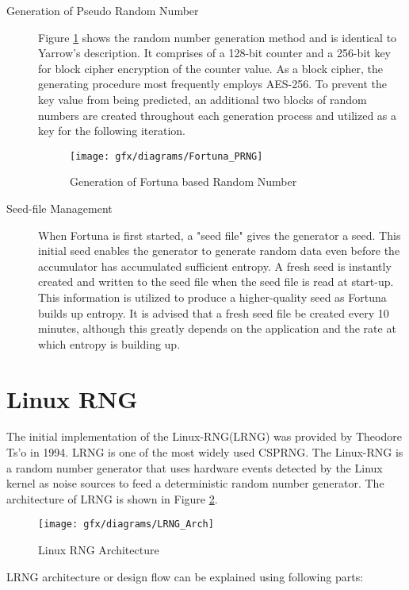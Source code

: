 \begin{description}
	\item[Generation of Pseudo Random Number] Figure \ref{fig:3:14} shows the random number generation method and is identical to Yarrow's description. It comprises of a 128-bit counter and a 256-bit key for block cipher encryption of the counter value. As a block cipher, the generating procedure most frequently employs AES-256. To prevent the key value from being predicted, an additional two blocks of random numbers are created throughout each generation process and utilized as a key for the following iteration.
	\begin{figure}[htbp]
		\centering
		\texttt{[image: gfx/diagrams/Fortuna\_PRNG]}
		\caption{Generation of Fortuna based Random Number}
		\label{fig:3:14}
	\end{figure}

	\item[Seed-file Management] When Fortuna is first started, a "seed file" gives the generator a seed. This initial seed enables the generator to generate random data even before the accumulator has accumulated sufficient entropy. A fresh seed is instantly created and written to the seed file when the seed file is read at start-up. This information is utilized to produce a higher-quality seed as Fortuna builds up entropy. It is advised that a fresh seed file be created every 10 minutes, although this greatly depends on the application and the rate at which entropy is building up.
\end{description}

%
%
\section{Linux RNG}
\label{sec:SoA:LRNG}
The initial implementation of the Linux-RNG(LRNG) was provided by Theodore Ts'o in 1994. LRNG is one of the most widely used CSPRNG. The Linux-RNG is a random number generator that uses hardware events detected by the Linux kernel as noise sources to feed a deterministic random number generator. The architecture of LRNG is shown in Figure \ref{fig:3:15}. 
\begin{figure}[htbp]
	\centering
	\texttt{[image: gfx/diagrams/LRNG\_Arch]}
	\caption{Linux RNG Architecture}
	\label{fig:3:15}
\end{figure}

LRNG architecture or design flow can be explained using following parts: 

